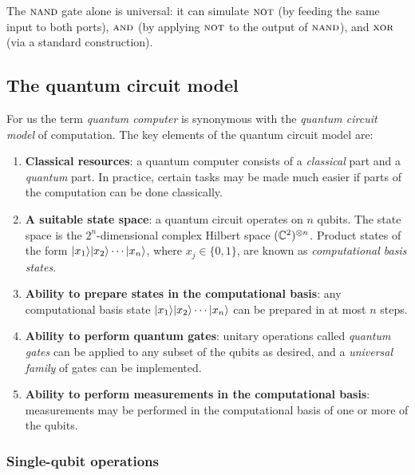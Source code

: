 \begin{remark}
  The $\textsc{nand}$ gate alone is universal: it can simulate $\textsc{not}$ (by feeding the same input to both ports), $\textsc{and}$ (by applying $\textsc{not}$ to the output of $\textsc{nand}$), and $\textsc{xor}$ (via a standard construction).
\end{remark}


\subsection{The quantum circuit model}\label{subsec:qcircuit-model}

For us the term \emph{quantum computer} is synonymous with the \emph{quantum
  circuit model} of computation.  The key elements of the quantum circuit
model are:

\begin{keyresult}
  \begin{enumerate}
    \item \textbf{Classical resources}: a quantum computer consists of a
      \emph{classical} part and a \emph{quantum} part.  In practice, certain
      tasks may be made much easier if parts of the computation can be done
      classically.
    \item \textbf{A suitable state space}: a quantum circuit operates on $n$
      qubits.  The state space is the $2^n$-dimensional complex Hilbert
      space $(\mathbb{C}^2)^{\otimes n}$.  Product states of the form
      $|x_1\rangle|x_2\rangle\cdots |x_n\rangle$, where $x_j \in \{0,1\}$, are
      known as \emph{computational basis states}.
    \item \textbf{Ability to prepare states in the computational basis}: any
      computational basis state
      $|x_1\rangle|x_2\rangle\cdots |x_n\rangle$ can be prepared in at most $n$
      steps.
    \item \textbf{Ability to perform quantum gates}: unitary operations
      called \emph{quantum gates} can be applied to any subset of the qubits
      as desired, and a \emph{universal family} of gates can be implemented.
    \item \textbf{Ability to perform measurements in the computational
        basis}: measurements may be performed in the computational basis of
      one or more of the qubits.
  \end{enumerate}
\end{keyresult}

\subsubsection{Single-qubit operations}\label{subsubsec:single-qubit}

